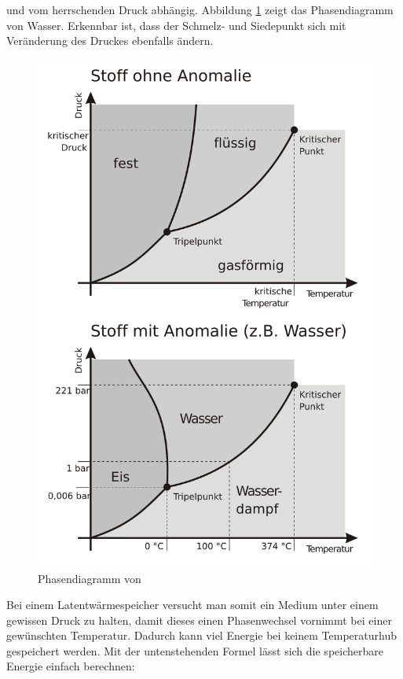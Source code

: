 \documentclass[11pt,a4paper]{scrartcl}
\begin{document}
und vom herrschenden Druck abhängig. Abbildung \ref{fig:H2O2} zeigt das
Phasendiagramm von Wasser. Erkennbar ist, dass der Schmelz- und Siedepunkt sich
mit Veränderung des Druckes ebenfalls ändern.
\begin{figure}[h]
\begin{center}
\includegraphics[scale=0.6]{images/Phasendiagramm2d.pdf}
\caption{Phasendiagramm von  \cite{Phasendiagramm}}
\label{fig:H2O2}
\end{center}
\end{figure}
Bei einem Latentwärmespeicher versucht man somit ein Medium unter einem gewissen
Druck zu halten, damit dieses einen Phasenwechsel vornimmt bei einer gewünschten
Temperatur. Dadurch kann viel Energie bei keinem Temperaturhub gespeichert
werden. Mit der untenstehenden Formel lässt sich die speicherbare Energie
einfach berechnen:
\end{document}
